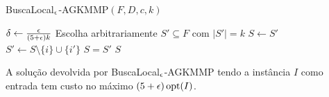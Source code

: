 \begin{algorithm}[H]
    \caption{\sc BuscaLocal$_\epsilon$-AGKMMP$(F,D,c,k)$}
    \begin{algorithmic}[1]
        \State $\delta \gets \frac{\epsilon}{(5+\epsilon)k}$
        \State Escolha arbitrariamente $S' \subseteq F$ com $|S'| = k$
        \Repeat
        \State $S\gets S'$
        \State $S' \gets S \setminus \{i\} \cup \{i'\}$
        \EndIf
        \Until $S=S'$
        \State \Return $S$
    \end{algorithmic}
\end{algorithm}

\begin{theorem}
    A solução devolvida por {\sc BuscaLocal$_\epsilon$-AGKMMP} tendo a instância $I$ como entrada tem custo no máximo $(5+\epsilon)\,\mathrm{opt}(I)$.
\end{theorem}

